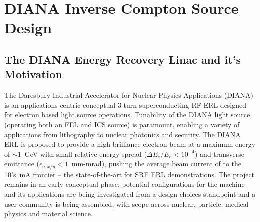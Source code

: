 \documentclass[../main.tex]{subfiles}
\begin{document}
\chapter{DIANA Inverse Compton Source Design}
\label{DIANA_Inverse_Compton_Source_Design} %

\section{The DIANA Energy Recovery Linac and it's Motivation}

The Daresbury Industrial Accelerator for Nuclear Physics Applications (DIANA) is an applications centric conceptual 3-turn superconducting RF ERL designed for electron based light source operations. Tunability of the DIANA light source (operating both an FEL and ICS source) is paramount, enabling a variety of applications from lithography to nuclear photonics and security. The DIANA ERL is proposed to provide a high brilliance electron beam at a maximum energy of $\sim$1~\si{\giga\electronvolt} with small relative energy spread ($\Delta E_{e}/E_{e} < 10^{-4}$) and transverse emittance ($\epsilon_{n,x/y}< 1$~\si{\milli\meter}-\si{\milli\radian}), pushing the average beam current of to the 10's~\si{\milli\ampere} frontier -- the state-of-the-art for SRF ERL demonstrations. The project remains in an early conceptual phase; potential configurations for the machine and its applications are being investigated from a design choices standpoint and a user community is being assembled, with scope across nuclear, particle, medical physics and material science.  
\end{document}
